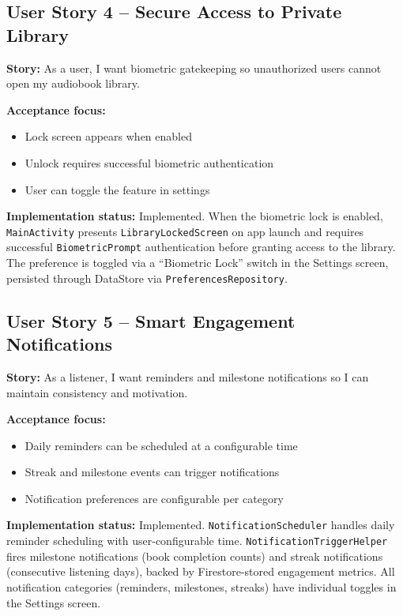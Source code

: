 \documentclass[11pt,a4paper]{article}
\begin{document}
\subsection{User Story 4 -- Secure Access to Private Library}

\textbf{Story:} As a user, I want biometric gatekeeping so unauthorized users cannot open my audiobook library.

\textbf{Acceptance focus:}
\begin{itemize}[noitemsep]
    \item Lock screen appears when enabled
    \item Unlock requires successful biometric authentication
    \item User can toggle the feature in settings
\end{itemize}

\textbf{Implementation status:} Implemented. When the biometric lock is enabled, \texttt{MainActivity} presents \texttt{LibraryLockedScreen} on app launch and requires successful \texttt{BiometricPrompt} authentication before granting access to the library. The preference is toggled via a ``Biometric Lock'' switch in the Settings screen, persisted through DataStore via \texttt{PreferencesRepository}.

\subsection{User Story 5 -- Smart Engagement Notifications}

\textbf{Story:} As a listener, I want reminders and milestone notifications so I can maintain consistency and motivation.

\textbf{Acceptance focus:}
\begin{itemize}[noitemsep]
    \item Daily reminders can be scheduled at a configurable time
    \item Streak and milestone events can trigger notifications
    \item Notification preferences are configurable per category
\end{itemize}

\textbf{Implementation status:} Implemented. \texttt{NotificationScheduler} handles daily reminder scheduling with user-configurable time. \texttt{NotificationTriggerHelper} fires milestone notifications (book completion counts) and streak notifications (consecutive listening days), backed by Firestore-stored engagement metrics. All notification categories (reminders, milestones, streaks) have individual toggles in the Settings screen.
\end{document}
